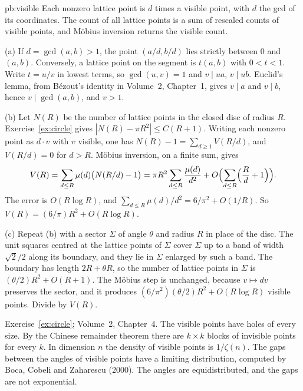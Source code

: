 \begin{solution}{pb:visible}
\idea Each nonzero lattice point is $d$ times a visible point, with $d$ the gcd of its coordinates. The count of all lattice points is a sum of rescaled counts of visible points, and Möbius inversion returns the visible count.

\writeup (a) If $d=\gcd(a,b)>1$, the point $(a/d,b/d)$ lies strictly between $0$ and $(a,b)$. Conversely, a lattice point on the segment is $t(a,b)$ with $0<t<1$. Write $t=u/v$ in lowest terms, so $\gcd(u,v)=1$ and $v\mid ua$, $v\mid ub$. Euclid's lemma, from Bézout's identity in Volume~2, Chapter~1, gives $v\mid a$ and $v\mid b$, hence $v\mid\gcd(a,b)$, and $v>1$.

(b) Let $N(R)$ be the number of lattice points in the closed disc of radius $R$. Exercise~\ref{ex:circle} gives $|N(R)-\pi R^2|\le C(R+1)$. Writing each nonzero point as $d\cdot v$ with $v$ visible, one has $N(R)-1=\sum_{d\ge1}V(R/d)$, and $V(R/d)=0$ for $d>R$. Möbius inversion, on a finite sum, gives
\[
V(R)=\sum_{d\le R}\mu(d)\bigl(N(R/d)-1\bigr)=\pi R^2\sum_{d\le R}\frac{\mu(d)}{d^2}+O\Bigl(\sum_{d\le R}\Bigl(\frac Rd+1\Bigr)\Bigr).
\]
The error is $O(R\log R)$, and $\sum_{d\le R}\mu(d)/d^2=6/\pi^2+O(1/R)$. So $V(R)=(6/\pi)R^2+O(R\log R)$.

(c) Repeat (b) with a sector $\Sigma$ of angle $\theta$ and radius $R$ in place of the disc. The unit squares centred at the lattice points of $\Sigma$ cover $\Sigma$ up to a band of width $\sqrt2/2$ along its boundary, and they lie in $\Sigma$ enlarged by such a band. The boundary has length $2R+\theta R$, so the number of lattice points in $\Sigma$ is $(\theta/2)R^2+O(R+1)$. The Möbius step is unchanged, because $v\mapsto dv$ preserves the sector, and it produces $(6/\pi^2)(\theta/2)R^2+O(R\log R)$ visible points. Divide by $V(R)$.

\tools Exercise~\ref{ex:circle}; Volume~2, Chapter~4.
\leads The visible points have holes of every size. By the Chinese remainder theorem there are $k\times k$ blocks of invisible points for every $k$. In dimension $n$ the density of visible points is $1/\zeta(n)$. The gaps between the angles of visible points have a limiting distribution, computed by Boca, Cobeli and Zaharescu (2000). The angles are equidistributed, and the gaps are not exponential.
\end{solution}

